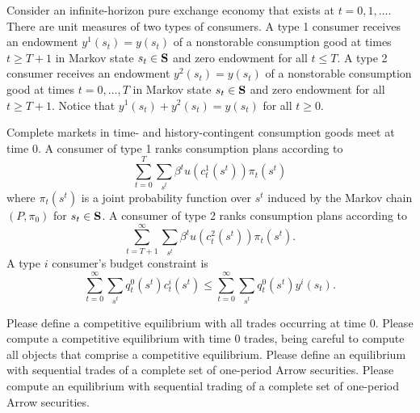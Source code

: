 \noindent Consider an infinite-horizon pure exchange economy that exists at $t=0, 1, \ldots $.
There are unit measures of  two types of consumers.
A type 1 consumer receives an endowment $y^1(s_t) = y(s_t)$ of a nonstorable consumption good at times $t\geq T+1$
in Markov state $s_t \in {\bf S}$ and zero endowment for all $ t \leq T$.  A type 2 consumer receives an endowment $y^2(s_t) = y(s_t)$ of a nonstorable consumption good at times $t =0, \ldots, T$
in Markov state $s_t \in {\bf S}$ and zero endowment for all $t \geq T+1$.  Notice that $y^1(s_t) + y^2(s_t) = y(s_t)$ for all $t \geq 0$.

Complete markets in time- and  history-contingent consumption goods
meet at time $0$. A consumer of type 1  ranks consumption plans according to 
$$ \sum_{t=0}^T \sum_{s^t} \beta^t u(c_t^1(s^t)) \pi_t(s^t)$$
where $\pi_t(s^t)$ is a joint probability function over $s^t$ induced by the Markov chain $(P, \pi_0)$ for $s_t \in 
{\bf S}$.
A consumer of type 2 ranks consumption plans according to 
$$ \sum_{t=T+1}^\infty \sum_{s^t} \beta^t u(c_t^2(s^t)) \pi_t(s^t) .$$
A type $i$ consumer's budget constraint is
$$ \sum_{t=0}^\infty \sum_{s^t} q_t^0(s^t) c^i_t(s^t) \leq  \sum_{t=0}^\infty \sum_{s^t} q_t^0(s^t) y^i(s_t) . $$
 
\medskip
{} Please define a competitive equilibrium with all trades occurring at time $0$.
\medskip
{} Please compute a competitive equilibrium with time $0$ trades, being careful to compute
all objects that comprise a competitive equilibrium.
\medskip
{} Please define an equilibrium with sequential trades of a complete set of one-period Arrow  securities.
\medskip
{} Please compute an equilibrium with sequential trading of a complete set of one-period Arrow securities.




\medskip


 
\medskip

